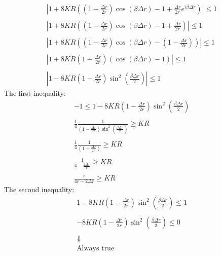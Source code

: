 \documentclass[11pt, a4paper]{article}
\begin{document}
\begin{equation}
    \begin{array}{c}
        \displaystyle \left|1+8KR\left(\left(1-\frac{\Delta r}{2r}\right)\cos{\left(\beta\Delta r\right)}-1+\frac{\Delta r}{2r}e^{i\beta\Delta r}\right)\right|\le1 \\\\
        \displaystyle \left|1+8KR\left(\left(1-\frac{\Delta r}{2r}\right)\cos{\left(\beta\Delta r\right)}-1+\frac{\Delta r}{2r}\right)\right|\le1 \\\\
        \displaystyle \left|1+8KR\left(\left(1-\frac{\Delta r}{2r}\right)\cos{\left(\beta\Delta r\right)}-\left(1-\frac{\Delta r}{2r}\right)\right)\right|\le1 \\\\
        \displaystyle \left|1+8KR\left(1-\frac{\Delta r}{2r}\right)\left(\cos{\left(\beta\Delta r\right)}-1\right)\right|\le1 \\\\
        \displaystyle \left|1-8KR\left(1-\frac{\Delta r}{2r}\right)\sin^2{\left(\frac{\beta\Delta r}{2}\right)}\right|\le1
    \end{array}
\end{equation}
The first inequality:
\begin{equation}
    \begin{array}{c}
        \displaystyle -1\le1-8KR\left(1-\frac{\Delta r}{2r}\right)\sin^2{\left(\frac{\beta\Delta r}{2}\right)} \\\\
        \displaystyle \frac{1}{4}\frac{1}{\displaystyle \left(1-\frac{\Delta r}{2r}\right)\sin^2{\left(\frac{\beta\Delta r}{2}\right)}}\ge KR \\\\
        \displaystyle \frac{1}{4}\frac{1}{\displaystyle \left(1-\frac{\Delta r}{2r}\right)}\ge KR \\\\
        \displaystyle \frac{1}{\displaystyle 4-\frac{2\Delta r}{r}}\ge KR \\\\
        \displaystyle \frac{r}{\displaystyle 4r-2\Delta r}\ge KR 
    \end{array}
\end{equation}
The second inequality:
\begin{equation}
    \begin{array}{c}
        \displaystyle 1-8KR\left(1-\frac{\Delta r}{2r}\right)\sin^2{\left(\frac{\beta\Delta r}{2}\right)}\le1 \\\\
        \displaystyle -8KR\left(1-\frac{\Delta r}{2r}\right)\sin^2{\left(\frac{\beta\Delta r}{2}\right)}\le0 \\\\
        \Downarrow \\
        \text{Always true}
    \end{array}
\end{equation}
\end{document}
